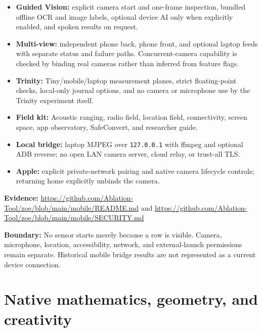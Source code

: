 \documentclass[11pt]{article}
\newcommand{\boundary}[1]{\par\smallskip\small\color{ZoeGray}\textbf{Boundary:} #1\normalsize\par\smallskip}
\newcommand{\evidence}[1]{\par\smallskip\small\color{ZoeGray}\textbf{Evidence:} #1\normalsize\par\smallskip}
\begin{document}
\begin{itemize}
  \item \textbf{Guided Vision:} explicit camera start and one-frame inspection, bundled offline OCR and image labels, optional device AI only when explicitly enabled, and spoken results on request.
  \item \textbf{Multi-view:} independent phone back, phone front, and optional laptop feeds with separate status and failure paths. Concurrent-camera capability is checked by binding real cameras rather than inferred from feature flags.
  \item \textbf{Trinity:} Tiny/mobile/laptop measurement planes, strict floating-point checks, local-only journal options, and no camera or microphone use by the Trinity experiment itself.
  \item \textbf{Field kit:} Acoustic ranging, radio field, location field, connectivity, screen space, app observatory, SafeConvert, and researcher guide.
  \item \textbf{Local bridge:} laptop MJPEG over \texttt{127.0.0.1} with ffmpeg and optional ADB reverse; no open LAN camera server, cloud relay, or trust-all TLS.
  \item \textbf{Apple:} explicit private-network pairing and native camera lifecycle controls; returning home explicitly unbinds the camera.
\end{itemize}

\evidence{\url{https://github.com/Ablation-Tool/zoe/blob/main/mobile/README.md} and \url{https://github.com/Ablation-Tool/zoe/blob/main/mobile/SECURITY.md}}
\boundary{No sensor starts merely because a row is visible. Camera, microphone, location, accessibility, network, and external-launch permissions remain separate. Historical mobile bridge results are not represented as a current device connection.}

\clearpage
\section{Native mathematics, geometry, and creativity}
\end{document}
